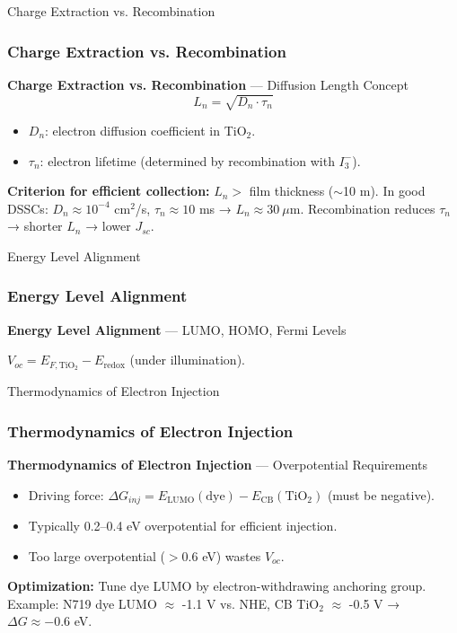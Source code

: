 \documentclass[aspectratio=169]{beamer}
\begin{document}
\begin{frame}{Charge Extraction vs. Recombination}
\frametitle{Charge Extraction vs. Recombination}

\textbf{Charge Extraction vs. Recombination} — Diffusion Length Concept
\[
L_n = \sqrt{D_n \cdot \tau_n}
\]
\begin{itemize}
\item $D_n$: electron diffusion coefficient in TiO$_2$.
\item $\tau_n$: electron lifetime (determined by recombination with $I_3^-$).
\end{itemize}
\textbf{Criterion for efficient collection:} $L_n >$ film thickness ($\sim$10 \textmu m).
\vspace{2mm}
In good DSSCs: $D_n \approx 10^{-4}$ cm$^2$/s, $\tau_n \approx 10$ ms → $L_n \approx 30\ \mu$m.
\vspace{2mm}
Recombination reduces $\tau_n$ → shorter $L_n$ → lower $J_{sc}$.
\cite{Frank2004}
\end{frame}


\begin{frame}{Energy Level Alignment}
\frametitle{Energy Level Alignment}

\textbf{Energy Level Alignment} — LUMO, HOMO, Fermi Levels
\begin{center}
\end{center}
$V_{oc} = E_{F,\text{TiO}_2} - E_{\text{redox}}$ (under illumination).
\cite{Cahen2003}
\end{frame}


\begin{frame}{Thermodynamics of Electron Injection}
\frametitle{Thermodynamics of Electron Injection}

\textbf{Thermodynamics of Electron Injection} — Overpotential Requirements
\begin{itemize}
\item Driving force: $\Delta G_{inj} = E_{\text{LUMO}}(\text{dye}) - E_{\text{CB}}(\text{TiO}_2)$ (must be negative).
\item Typically 0.2–0.4 eV overpotential for efficient injection.
\item Too large overpotential ($>$0.6 eV) wastes $V_{oc}$.
\end{itemize}
\textbf{Optimization:} Tune dye LUMO by electron-withdrawing anchoring group.
\vspace{2mm}
Example: N719 dye LUMO $\approx$ -1.1 V vs. NHE, CB TiO$_2$ $\approx$ -0.5 V → $\Delta G \approx -0.6$ eV.
\cite{Nazeeruddin2003}
\end{frame}
\end{document}
